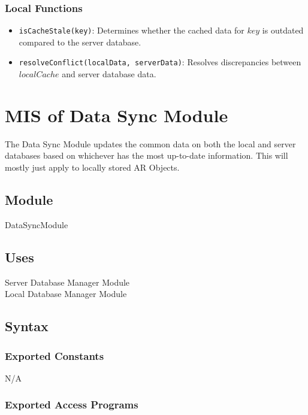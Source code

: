 \documentclass[12pt, titlepage]{article}
\begin{document}
\subsubsection{Local Functions}

\begin{itemize}
  \item \texttt{isCacheStale(key)}: Determines whether the cached data for \( key \) is outdated compared to the server database.
  \item \texttt{resolveConflict(localData, serverData)}: Resolves discrepancies between \( localCache \) and server database data.
\end{itemize}

\newpage

\section{MIS of Data Sync Module} \label{DataSync}

The Data Sync Module updates the common data on both the local and server databases based on whichever has the most up-to-date information. This will mostly just apply to locally stored AR Objects.

\subsection{Module}

DataSyncModule

\subsection{Uses}

Server Database Manager Module\\
Local Database Manager Module

\subsection{Syntax}

\subsubsection{Exported Constants}

N/A

\subsubsection{Exported Access Programs}
\end{document}
